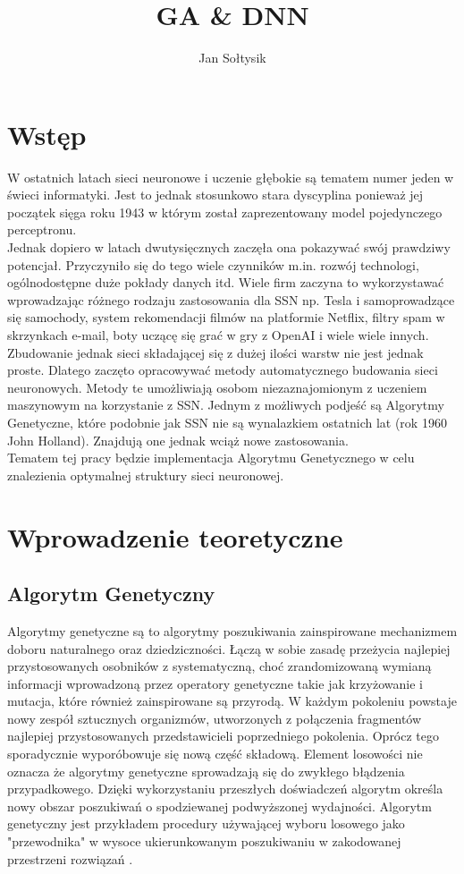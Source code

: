\documentclass{article}
\title{GA \& DNN}
\author{Jan Sołtysik}
\begin{document}
\maketitle
\tableofcontents


\section{Wstęp}
W ostatnich latach sieci neuronowe i uczenie głębokie  są tematem numer jeden w świeci
informatyki. Jest to jednak stosunkowo stara dyscyplina ponieważ jej początek sięga roku 1943 
w którym został zaprezentowany model pojedynczego perceptronu.\\
Jednak dopiero w latach dwutysięcznych zaczęła ona pokazywać swój prawdziwy potencjał.
Przyczyniło się do tego wiele czynników m.in. rozwój technologi, ogólnodostępne duże pokłady
danych itd. Wiele firm  zaczyna to wykorzystawać wprowadzając różnego 
rodzaju zastosowania dla SSN np. Tesla i samoprowadzące się samochody, system rekomendacji 
filmów na platformie Netflix, filtry spam w skrzynkach e-mail, boty uczącę się grać w gry
z OpenAI  i wiele wiele innych.\\
Zbudowanie jednak sieci składającej się z dużej ilości warstw nie jest jednak proste. 
Dlatego zaczęto opracowywać metody automatycznego budowania sieci neuronowych. 
Metody te umożliwiają osobom niezaznajomionym z uczeniem maszynowym na korzystanie z SSN. Jednym
z możliwych podjeść są Algorytmy Genetyczne, które podobnie jak SSN nie są wynalazkiem
ostatnich lat (rok 1960 John Holland). Znajdują one jednak wciąż nowe zastosowania.\\
Tematem tej pracy będzie implementacja Algorytmu Genetycznego w celu znalezienia optymalnej
struktury sieci neuronowej.


\section{Wprowadzenie teoretyczne}

\subsection{Algorytm Genetyczny}
Algorytmy genetyczne są to algorytmy poszukiwania zainspirowane mechanizmem doboru naturalnego
oraz dziedziczności. Łączą w sobie  zasadę przeżycia najlepiej przystosowanych 
osobników z systematyczną, choć zrandomizowaną wymianą informacji wprowadzoną przez
operatory genetyczne takie jak krzyżowanie i mutacja, które również zainspirowane są
przyrodą. W każdym pokoleniu powstaje
nowy zespół sztucznych organizmów, utworzonych z połączenia fragmentów najlepiej przystosowanych
przedstawicieli poprzedniego pokolenia. Oprócz tego sporadycznie wyporóbowuje się nową część 
składową. Element losowości nie oznacza że algorytmy genetyczne sprowadzają się do zwykłego
błądzenia przypadkowego. Dzięki wykorzystaniu przeszłych doświadczeń algorytm określa nowy obszar
poszukiwań o spodziewanej podwyższonej wydajności.
Algorytm genetyczny jest przykładem procedury używającej wyboru losowego jako 
"przewodnika" w wysoce ukierunkowanym poszukiwaniu w zakodowanej przestrzeni rozwiązań
\cite{goldberg}.\\
\end{document}
